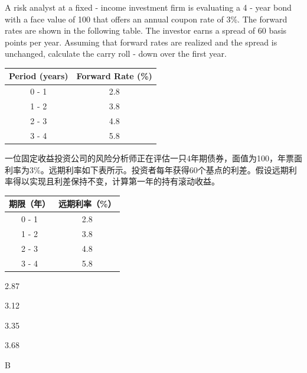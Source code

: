 \documentclass{article}
\newcounter{question} %
\begin{document}
\begin{question}
    A risk analyst at a fixed - income investment firm is evaluating a 4 - year bond with a face value of 100 that offers an annual coupon rate of 3\%. The forward rates are shown in the following table. The investor earns a spread of 60 basis points per year. Assuming that forward rates are realized and the spread is unchanged, calculate the carry roll - down over the first year.
    \begin{center}
    \begin{tabular}{|c|c|}
    \hline
    Period (years) & Forward Rate (\%) \\
    \hline
    0 - 1 & 2.8 \\
    \hline
    1 - 2 & 3.8 \\
    \hline
    2 - 3 & 4.8 \\
    \hline
    3 - 4 & 5.8 \\
    \hline
    \end{tabular}
    \end{center}
    一位固定收益投资公司的风险分析师正在评估一只4年期债券，面值为100，年票面利率为3\%。远期利率如下表所示。投资者每年获得60个基点的利差。假设远期利率得以实现且利差保持不变，计算第一年的持有滚动收益。
    \begin{center}
    \begin{tabular}{|c|c|}
    \hline
    期限（年） & 远期利率（\%） \\
    \hline
    0 - 1 & 2.8 \\
    \hline
    1 - 2 & 3.8 \\
    \hline
    2 - 3 & 4.8 \\
    \hline
    3 - 4 & 5.8 \\
    \hline
    \end{tabular}
    \end{center}
    \end{question}
    
    \begin{choices}
        \item 2.87
        \item 3.12
        \item 3.35
        \item 3.68
    \end{choices}
    
    \begin{correctanswer}
    B
    \end{correctanswer}
    
\end{document}
